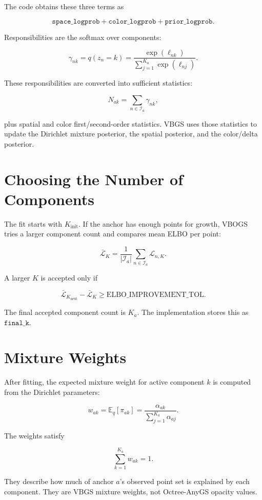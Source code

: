 \documentclass[11pt]{article}
\newcommand{\E}{\mathbb{E}}
\begin{document}
The code obtains these three terms as

\[
  \texttt{space\_logprob}
  +
  \texttt{color\_logprob}
  +
  \texttt{prior\_logprob}.
\]

Responsibilities are the softmax over components:

\[
  \gamma_{nk}
  =
  q(z_n = k)
  =
  \frac{\exp(\ell_{nk})}
       {\sum_{j=1}^{K_a} \exp(\ell_{nj})}.
\]

These responsibilities are converted into sufficient statistics:

\[
  N_{ak} = \sum_{n \in \mathcal{I}_a} \gamma_{nk},
\]

plus spatial and color first/second-order statistics. VBGS uses those
statistics to update the Dirichlet mixture posterior, the spatial posterior,
and the color/delta posterior.

\section{Choosing the Number of Components}

The fit starts with \(K_{\mathrm{init}}\). If the anchor has enough points for
growth, VBOGS tries a larger component count and compares mean ELBO per point:

\[
  \bar{\mathcal{L}}_K
  =
  \frac{1}{|\mathcal{I}_a|}
  \sum_{n \in \mathcal{I}_a}
  \mathcal{L}_{n,K}.
\]

A larger \(K\) is accepted only if

\[
  \bar{\mathcal{L}}_{K_{\mathrm{next}}}
  -
  \bar{\mathcal{L}}_K
  \geq
  \mathrm{ELBO\_IMPROVEMENT\_TOL}.
\]

The final accepted component count is \(K_a\). The implementation stores this
as \(\texttt{final\_k}\).

\section{Mixture Weights}

After fitting, the expected mixture weight for active component \(k\) is
computed from the Dirichlet parameters:

\[
  w_{ak}
  =
  \E_q[\pi_{ak}]
  =
  \frac{\alpha_{ak}}
       {\sum_{j=1}^{K_a} \alpha_{aj}}.
\]

The weights satisfy

\[
  \sum_{k=1}^{K_a} w_{ak} = 1.
\]

They describe how much of anchor \(a\)'s observed point set is explained by
each component. They are VBGS mixture weights, not Octree-AnyGS opacity values.
\end{document}
